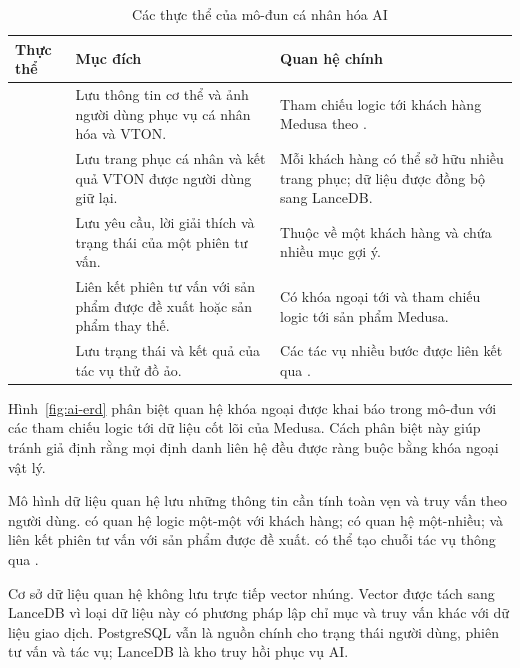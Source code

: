 \begin{table}[H]
\centering
\small
\caption{Các thực thể của mô-đun cá nhân hóa AI}
\label{tab:ai-personalization-entities}
\begin{tabularx}{\textwidth}{L{3.4cm}L{5.0cm}Y}
\toprule
\textbf{Thực thể} & \textbf{Mục đích} & \textbf{Quan hệ chính} \\
\midrule
{} & Lưu thông tin cơ thể và ảnh người dùng phục vụ cá nhân hóa và VTON. & Tham chiếu logic tới khách hàng Medusa theo . \\
\addlinespace
{} & Lưu trang phục cá nhân và kết quả VTON được người dùng giữ lại. & Mỗi khách hàng có thể sở hữu nhiều trang phục; dữ liệu được đồng bộ sang LanceDB. \\
\addlinespace
{} & Lưu yêu cầu, lời giải thích và trạng thái của một phiên tư vấn. & Thuộc về một khách hàng và chứa nhiều mục gợi ý. \\
\addlinespace
{} & Liên kết phiên tư vấn với sản phẩm được đề xuất hoặc sản phẩm thay thế. & Có khóa ngoại tới  và tham chiếu logic tới sản phẩm Medusa. \\
\addlinespace
{} & Lưu trạng thái và kết quả của tác vụ thử đồ ảo. & Các tác vụ nhiều bước được liên kết qua . \\
\bottomrule
\end{tabularx}
\end{table}



Hình~\ref{fig:ai-erd} phân biệt quan hệ khóa ngoại được khai báo trong mô-đun với các tham chiếu logic tới dữ liệu cốt lõi của Medusa. Cách phân biệt này giúp tránh giả định rằng mọi định danh liên hệ đều được ràng buộc bằng khóa ngoại vật lý.

\medskip

Mô hình dữ liệu quan hệ lưu những thông tin cần tính toàn vẹn và truy vấn theo người dùng.  có quan hệ logic một-một với khách hàng;  có quan hệ một-nhiều;  và  liên kết phiên tư vấn với sản phẩm được đề xuất.  có thể tạo chuỗi tác vụ thông qua .

\medskip

Cơ sở dữ liệu quan hệ không lưu trực tiếp vector nhúng. Vector được tách sang LanceDB vì loại dữ liệu này có phương pháp lập chỉ mục và truy vấn khác với dữ liệu giao dịch. PostgreSQL vẫn là nguồn chính cho trạng thái người dùng, phiên tư vấn và tác vụ; LanceDB là kho truy hồi phục vụ AI.

